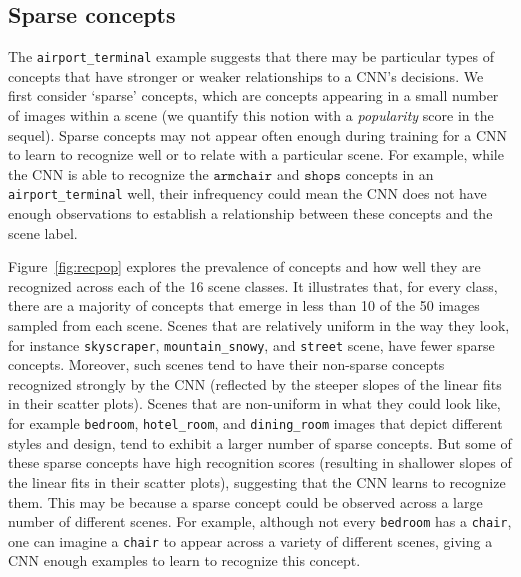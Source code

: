 \documentclass{article}
\begin{document}
\subsection{Sparse concepts}
The \texttt{airport\_terminal} example suggests that there may be 
particular types of concepts that have stronger or weaker relationships to a CNN's decisions. 
We first consider `sparse' concepts, which are concepts
appearing in a small number of images within a scene 
(we quantify this notion with a \textit{popularity} score in the sequel). 
Sparse concepts may not appear often enough
during training for a CNN to learn to recognize well or to relate with a particular scene. 
For example, while the CNN is able to recognize the $\texttt{armchair}$ and $\texttt{shops}$ 
concepts in an \texttt{airport\_terminal} well, their infrequency 
could mean the CNN does not have enough observations to establish a relationship between
these concepts and the scene label. 

Figure~\ref{fig:recpop} explores the prevalence of concepts and how well they are recognized 
across each of the 16 scene classes. 
It illustrates that, for every class, there are a majority of concepts that emerge in less
than 10 of the 50 images sampled from each scene. Scenes that are relatively uniform in the way they look,
for instance \texttt{skyscraper}, \texttt{mountain\_snowy}, and \texttt{street} scene, have fewer 
sparse concepts. Moreover, such scenes tend to have their non-sparse
concepts recognized strongly by the CNN (reflected by the steeper 
slopes of the linear fits in their scatter plots). Scenes that are non-uniform in what they could look like,
for example \texttt{bedroom}, \texttt{hotel\_room}, and \texttt{dining\_room} images
that depict different styles and design, tend to exhibit a larger number of sparse concepts. 
But some of these sparse concepts have 
high recognition scores (resulting in shallower slopes of the linear fits in their scatter plots), suggesting 
that the CNN learns to recognize them. This may be because 
a sparse concept could be observed across a large number of different scenes. For example,
although not every \texttt{bedroom} has a \texttt{chair}, one can imagine a \texttt{chair} 
to appear across a variety of different scenes, giving a CNN enough examples to learn to recognize 
this concept. 
\end{document}
